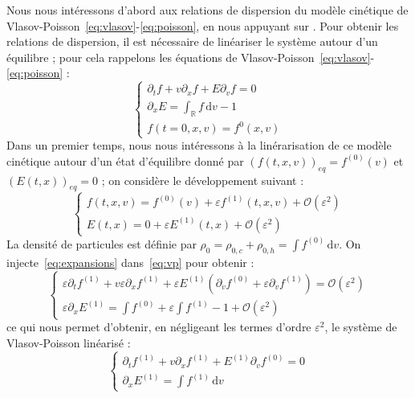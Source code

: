 Nous nous intéressons d'abord aux relations de dispersion du modèle cinétique de Vlasov-Poisson~\eqref{eq:vlasov}-\eqref{eq:poisson}, en nous appuyant sur \cite{Sonnendrucker:2015}. Pour obtenir les relations de dispersion, il est nécessaire de linéariser le système autour d'un équilibre ; pour cela rappelons les équations de Vlasov-Poisson~\eqref{eq:vlasov}-\eqref{eq:poisson} :
\begin{equation}
  \begin{cases}
    \partial_t f + v\partial_xf + E\partial_vf = 0 \\
    \partial_x E = \int_\mathbb{R} f\,\mathrm{d}v - 1 \\
    f(t=0, x, v)=f^0(x,v)
  \end{cases}
  \label{eq:vp}
\end{equation}
Dans un premier temps, nous nous intéressons à la linérarisation de ce modèle cinétique autour d'un état d'équilibre donné par $\left(f(t,x,v)\right)_{eq} = f^{(0)}(v)$ et $\left(E(t,x)\right)_{eq} = 0$ ; on considère le développement suivant :
\begin{equation}
  \begin{cases}
    f(t,x,v) = f^{(0)}(v) + \varepsilon f^{(1)}(t,x,v) + \mathcal{O}(\varepsilon^2) \\
    E(t,x) = 0 + \varepsilon E^{(1)}(t,x) + \mathcal{O}(\varepsilon^2)
  \end{cases}
  \label{eq:expansions}
\end{equation}
La densité de particules est définie par $\rho_0 = \rho_{0,c}+\rho_{0,h} = \int f^{(0)}\,\mathrm{d}v$. On injecte~\eqref{eq:expansions} dans~\eqref{eq:vp} pour obtenir :
$$
  \begin{cases}
    \varepsilon\partial_t f^{(1)} + v\varepsilon\partial_x f^{(1)} + \varepsilon E^{(1)}\left(\partial_v f^{(0)}+\varepsilon\partial_v f^{(1)}\right)=\mathcal{O}(\varepsilon^2) \\
    \varepsilon\partial_x E^{(1)} = \int f^{(0)} + \varepsilon\int f^{(1)} - 1 + \mathcal{O}(\varepsilon^2)
  \end{cases}
$$
ce qui nous permet d'obtenir, en négligeant les termes d'ordre $\varepsilon^2$, le système de Vlasov-Poisson linéarisé :
\begin{equation}
  \begin{cases}
    \partial_t f^{(1)} + v\partial_x f^{(1)} + E^{(1)}\partial_v f^{(0)} = 0 \\
    \partial_x E^{(1)} = \int f^{(1)}\,\mathrm{d}v
  \end{cases}
  \label{eq:systVPlin}
\end{equation}

